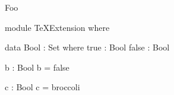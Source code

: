 \documentclass{article}
\begin{document}
Foo

\begin{code}

module TeXExtension where

  data Bool : Set where
    true : Bool
    false : Bool

  b : Bool
  b = false

\end{code}

  c : Bool
  c = broccoli
\end{document}

